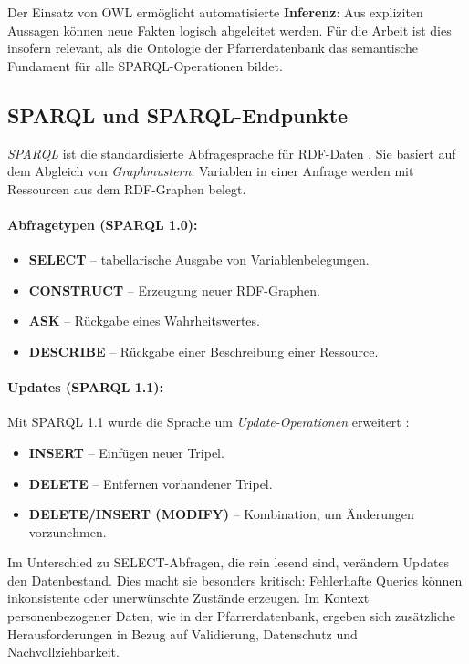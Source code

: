 Der Einsatz von OWL ermöglicht automatisierte \textbf{Inferenz}: Aus expliziten Aussagen können neue Fakten logisch abgeleitet werden. Für die Arbeit ist dies insofern relevant, als die Ontologie der Pfarrerdatenbank das semantische Fundament für alle SPARQL-Operationen bildet.  

\subsection{SPARQL und SPARQL-Endpunkte}

\textit{SPARQL} ist die standardisierte Abfragesprache für RDF-Daten \cite{w3c_sparql}. Sie basiert auf dem Abgleich von \textit{Graphmustern}: Variablen in einer Anfrage werden mit Ressourcen aus dem RDF-Graphen belegt.  

\paragraph{Abfragetypen (SPARQL 1.0):}  
\begin{itemize}
    \item \textbf{SELECT} – tabellarische Ausgabe von Variablenbelegungen.  
    \item \textbf{CONSTRUCT} – Erzeugung neuer RDF-Graphen.  
    \item \textbf{ASK} – Rückgabe eines Wahrheitswertes.  
    \item \textbf{DESCRIBE} – Rückgabe einer Beschreibung einer Ressource.  
\end{itemize}

\paragraph{Updates (SPARQL 1.1):}  
Mit SPARQL 1.1 wurde die Sprache um \textit{Update-Operationen} erweitert \cite{w3c_sparql11}:  
\begin{itemize}
    \item \textbf{INSERT} – Einfügen neuer Tripel.  
    \item \textbf{DELETE} – Entfernen vorhandener Tripel.  
    \item \textbf{DELETE/INSERT (MODIFY)} – Kombination, um Änderungen vorzunehmen.  
\end{itemize}

Im Unterschied zu SELECT-Abfragen, die rein lesend sind, verändern Updates den Datenbestand. Dies macht sie besonders kritisch: Fehlerhafte Queries können inkonsistente oder unerwünschte Zustände erzeugen. Im Kontext personenbezogener Daten, wie in der Pfarrerdatenbank, ergeben sich zusätzliche Herausforderungen in Bezug auf Validierung, Datenschutz und Nachvollziehbarkeit.  

